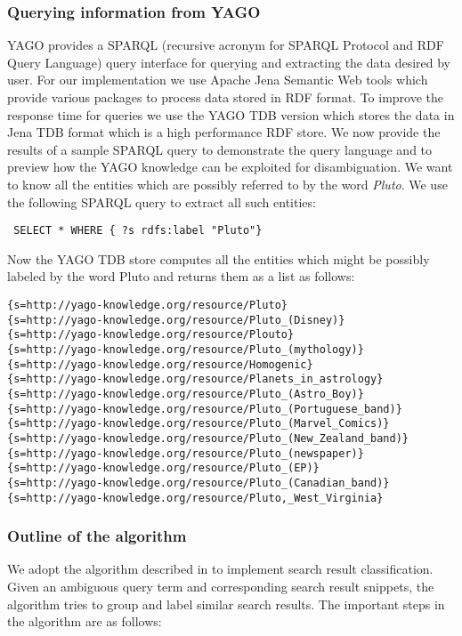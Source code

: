 \documentclass[a4paper,12pt]{report}
\begin{document}
\subsubsection{Querying information from YAGO}

YAGO provides a SPARQL (recursive acronym for SPARQL Protocol and RDF
Query Language) query interface for querying and extracting the data
desired by user. For our implementation we use Apache Jena Semantic
Web tools which provide various packages to process data stored in RDF
format. To improve the response time for queries we use the YAGO TDB
version which stores the data in Jena TDB format which is a high
performance RDF store. We now provide the results of a sample SPARQL
query to demonstrate the query language and to preview how the YAGO
knowledge can be exploited for disambiguation. We want to know all the
entities which are possibly referred to by the word {\it Pluto}. We
use the following SPARQL query to extract all such entities:

\begin{verbatim}
 SELECT * WHERE { ?s rdfs:label "Pluto"}
\end{verbatim}
Now the YAGO TDB store computes all the entities which might be
possibly labeled by the word Pluto and returns them as a list as
follows:
\begin{verbatim}
{s=http://yago-knowledge.org/resource/Pluto}
{s=http://yago-knowledge.org/resource/Pluto_(Disney)}
{s=http://yago-knowledge.org/resource/Plouto}
{s=http://yago-knowledge.org/resource/Pluto_(mythology)}
{s=http://yago-knowledge.org/resource/Homogenic}
{s=http://yago-knowledge.org/resource/Planets_in_astrology}
{s=http://yago-knowledge.org/resource/Pluto_(Astro_Boy)}
{s=http://yago-knowledge.org/resource/Pluto_(Portuguese_band)}
{s=http://yago-knowledge.org/resource/Pluto_(Marvel_Comics)}
{s=http://yago-knowledge.org/resource/Pluto_(New_Zealand_band)}
{s=http://yago-knowledge.org/resource/Pluto_(newspaper)}
{s=http://yago-knowledge.org/resource/Pluto_(EP)}
{s=http://yago-knowledge.org/resource/Pluto_(Canadian_band)}
{s=http://yago-knowledge.org/resource/Pluto,_West_Virginia}
\end{verbatim}

\subsubsection{Outline of the algorithm}

We adopt the algorithm described in \cite{yagoclust} to implement
search result classification. Given an ambiguous query term and
corresponding search result snippets, the algorithm tries to group and
label similar search results. The important steps in the algorithm are
as follows:
\end{document}
